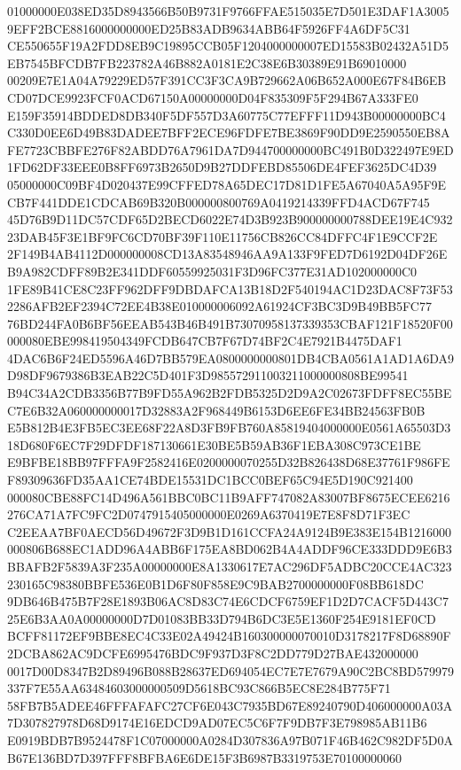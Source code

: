 \documentclass[UTF8,fontset=fandol,zihao=-4,a4paper]{ctexart}
\begin{document}
{{01000000E038ED35D8943566B50B9731F9766FFAE515035E7D501E3DAF1A30059EFF2BCE8816000000000ED25B83ADB9634ABB64F5926FF4A6DF5C31
CE550655F19A2FDD8EB9C19895CCB05F1204000000007ED15583B02432A51D5EB7545BFCDB7FB223782A46B882A0181E2C38E6B30389E91B69010000
00209E7E1A04A79229ED57F391CC3F3CA9B729662A06B652A000E67F84B6EBCD07DCE9923FCF0ACD67150A00000000D04F835309F5F294B67A333FE0
E159F35914BDDED8DB340F5DF557D3A60775C77EFFF11D943B00000000BC4C330D0EE6D49B83DADEE7BFF2ECE96FDFE7BE3869F90DD9E2590550EB8A
FE7723CBBFE276F82ABDD76A7961DA7D944700000000BC491B0D322497E9ED1FD62DF33EEE0B8FF6973B2650D9B27DDFEBD85506DE4FEF3625DC4D39
05000000C09BF4D020437E99CFFED78A65DEC17D81D1FE5A67040A5A95F9ECB7F441DDE1CDCAB69B320B000000800769A0419214339FFD4ACD67F745
45D76B9D11DC57CDF65D2BECD6022E74D3B923B900000000788DEE19E4C93223DAB45F3E1BF9FC6CD70BF39F110E11756CB826CC84DFFC4F1E9CCF2E
2F149B4AB4112D000000008CD13A83548946AA9A133F9FED7D6192D04DF26EB9A982CDFF89B2E341DDF60559925031F3D96FC377E31AD102000000C0
1FE89B41CE8C23FF962DFF9DBDAFCA13B18D2F540194AC1D23DAC8F73F532286AFB2EF2394C72EE4B38E010000006092A61924CF3BC3D9B49BB5FC77
76BD244FA0B6BF56EEAB543B46B491B73070958137339353CBAF121F18520F00000080EBE998419504349FCDB647CB7F67D74BF2C4E7921B4475DAF1
4DAC6B6F24ED5596A46D7BB579EA0800000000801DB4CBA0561A1AD1A6DA9D98DF9679386B3EAB22C5D401F3D985572911003211000000808BE99541
B94C34A2CDB3356B77B9FD55A962B2FDB5325D2D9A2C02673FDFF8EC55BEC7E6B32A060000000017D32883A2F968449B6153D6EE6FE34BB24563FB0B
E5B812B4E3FB5EC3EE68F22A8D3FB9FB760A85819404000000E0561A65503D318D680F6EC7F29DFDF187130661E30BE5B59AB36F1EBA308C973CE1BE
E9BFBE18BB97FFFA9F2582416E0200000070255D32B826438D68E37761F986FEF89309636FD35AA1CE74BDE15531DC1BCC0BEF65C94E5D190C921400
000080CBE88FC14D496A561BBC0BC11B9AFF747082A83007BF8675ECEE6216276CA71A7FC9FC2D0747915405000000E0269A6370419E7E8F8D71F3EC
C2EEAA7BF0AECD56D49672F3D9B1D161CCFA24A9124B9E383E154B1216000000806B688EC1ADD96A4ABB6F175EA8BD062B4A4ADDF96CE333DDD9E6B3
BBAFB2F5839A3F235A00000000E8A1330617E7AC296DF5ADBC20CCE4AC323230165C98380BBFE536E0B1D6F80F858E9C9BAB2700000000F08BB618DC
9DB646B475B7F28E1893B06AC8D83C74E6CDCF6759EF1D2D7CACF5D443C725E6B3AA0A00000000D7D01083BB33D794B6DC3E5E1360F254E9181EF0CD
BCFF81172EF9BBE8EC4C33E02A49424B160300000070010D3178217F8D68890F2DCBA862AC9DCFE6995476BDC9F937D3F8C2DD779D27BAE432000000
0017D00D8347B2D89496B088B28637ED694054EC7E7E7679A90C2BC8BD579979337F7E55AA63484603000000509D5618BC93C866B5EC8E284B775F71
58FB7B5ADEE46FFFAFAFC27CF6E043C7935BD67E89240790D406000000A03A7D307827978D68D9174E16EDCD9AD07EC5C6F7F9DB7F3E798985AB11B6
E0919BDB7B9524478F1C07000000A0284D307836A97B071F46B462C982DF5D0AB67E136BD7D397FFF8BFBA6E6DE15F3B6987B3319753E70100000060
}}
\end{document}
